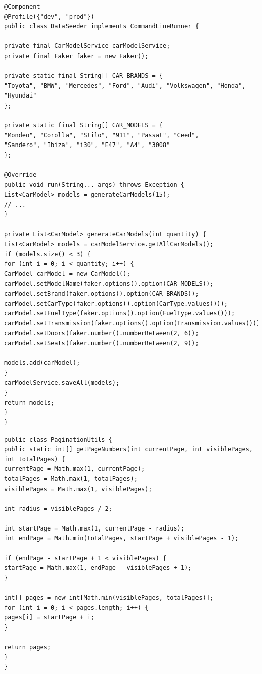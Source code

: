 \documentclass[12pt]{article}
\begin{document}
\begin{lstlisting}[style=customjava, caption={Fragment klasy DataSeeder – generowanie modeli samochodów}]
@Component
@Profile({"dev", "prod"})
public class DataSeeder implements CommandLineRunner {

private final CarModelService carModelService;
private final Faker faker = new Faker();

private static final String[] CAR_BRANDS = {
"Toyota", "BMW", "Mercedes", "Ford", "Audi", "Volkswagen", "Honda", "Hyundai"
};

private static final String[] CAR_MODELS = {
"Mondeo", "Corolla", "Stilo", "911", "Passat", "Ceed", 
"Sandero", "Ibiza", "i30", "E47", "A4", "3008"
};

@Override
public void run(String... args) throws Exception {
List<CarModel> models = generateCarModels(15);
// ...
}

private List<CarModel> generateCarModels(int quantity) {
List<CarModel> models = carModelService.getAllCarModels();
if (models.size() < 3) {
for (int i = 0; i < quantity; i++) {
CarModel carModel = new CarModel();
carModel.setModelName(faker.options().option(CAR_MODELS));
carModel.setBrand(faker.options().option(CAR_BRANDS));
carModel.setCarType(faker.options().option(CarType.values()));
carModel.setFuelType(faker.options().option(FuelType.values()));
carModel.setTransmission(faker.options().option(Transmission.values()));
carModel.setDoors(faker.number().numberBetween(2, 6));
carModel.setSeats(faker.number().numberBetween(2, 9));

models.add(carModel);
}
carModelService.saveAll(models);
}
return models;
}
}
\end{lstlisting}
	
\begin{lstlisting}[style=customJava, caption={Klasa PaginationUtils - oblicza numery stron do wyświetlenia w paginacji}]
public class PaginationUtils {
public static int[] getPageNumbers(int currentPage, int visiblePages, int totalPages) {
currentPage = Math.max(1, currentPage);
totalPages = Math.max(1, totalPages);
visiblePages = Math.max(1, visiblePages);

int radius = visiblePages / 2;

int startPage = Math.max(1, currentPage - radius);
int endPage = Math.min(totalPages, startPage + visiblePages - 1);

if (endPage - startPage + 1 < visiblePages) {
startPage = Math.max(1, endPage - visiblePages + 1);
}

int[] pages = new int[Math.min(visiblePages, totalPages)];
for (int i = 0; i < pages.length; i++) {
pages[i] = startPage + i;
}

return pages;
}
}
\end{lstlisting}
\end{document}
